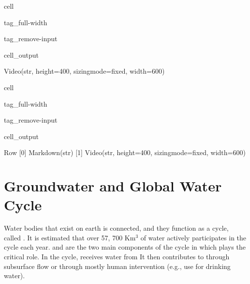 \documentclass[letterpaper,10pt,english]{jupyterBook}
\begin{document}
\begin{sphinxuseclass}{cell}
\begin{sphinxuseclass}{tag_full-width}
\begin{sphinxuseclass}{tag_remove-input}\begin{sphinxVerbatimOutput}

\begin{sphinxuseclass}{cell_output}
\begin{sphinxVerbatim}[commandchars=\\\{\}]
Video(str, height=400, sizing\PYGZus{}mode=\PYGZsq{}fixed\PYGZsq{}, width=600)
\end{sphinxVerbatim}

\end{sphinxuseclass}\end{sphinxVerbatimOutput}

\end{sphinxuseclass}
\end{sphinxuseclass}
\end{sphinxuseclass}
\begin{sphinxuseclass}{cell}
\begin{sphinxuseclass}{tag_full-width}
\begin{sphinxuseclass}{tag_remove-input}\begin{sphinxVerbatimOutput}

\begin{sphinxuseclass}{cell_output}
\begin{sphinxVerbatim}[commandchars=\\\{\}]
Row
    [0] Markdown(str)
    [1] Video(str, height=400, sizing\PYGZus{}mode=\PYGZsq{}fixed\PYGZsq{}, width=600)
\end{sphinxVerbatim}

\end{sphinxuseclass}\end{sphinxVerbatimOutput}

\end{sphinxuseclass}
\end{sphinxuseclass}
\end{sphinxuseclass}

\section{Groundwater and Global Water Cycle}
\label{\detokenize{content/background/03_basic_hydrogeology:groundwater-and-global-water-cycle}}
\sphinxAtStartPar
Water bodies that exist on earth is connected, and they function as a cycle, called . It is estimated that over 57, 700 Km\(^3\) of water actively participates in the cycle each year.  and  are the two main components of the cycle in which  plays the critical role. In the cycle,  receives water from  It then contributes to  through subsurface flow or through mostly human intervention (e.g., use for drinking water).
\end{document}
